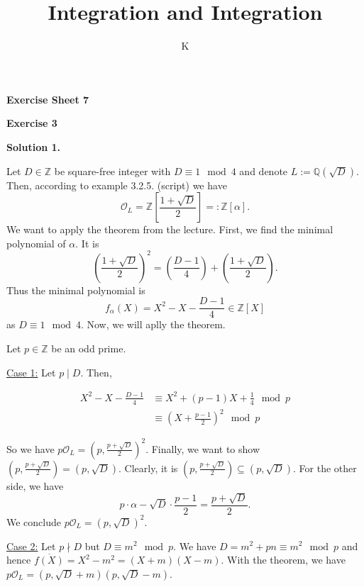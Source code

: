 \documentclass[a4paper]{article}
\title{Integration and Integration}
\author{K}
\theoremstyle{definition}
\begin{document}
\begin{center}
    \noindent\textbf{Exercise Sheet 7}
\end{center}
\noindent\textbf{Exercise 3}

\noindent\textbf{Solution 1.}

\noindent Let \(D \in \mathbb{Z}\) be square-free integer with \(D \equiv 1 \mod{4}\) and denote \(L := \mathbb{Q}(\sqrt{D})\). Then, according to example 3.2.5. (script) we have 
\begin{equation}
    \mathcal{O}_L = \mathbb{Z}\left[\frac{1 + \sqrt{D}}{2}\right] =: \mathbb{Z}[\alpha] \text{.}
\end{equation}
We want to apply the theorem from the lecture. First, we find the minimal polynomial of \(\alpha\). It is
\begin{equation}
    \left(\frac{1 + \sqrt{D}}{2}\right)^2 = \left(\frac{D - 1}{4}\right) + \left(\frac{1 + \sqrt{D}}{2}\right)\text{.}
\end{equation}
Thus the minimal polynomial is
\begin{equation}
    f_\alpha(X) = X^2 - X - \frac{D - 1}{4} \in \mathbb{Z}[X]
\end{equation}
as \(D \equiv 1 \mod{4}\). Now, we will aplly the theorem.

\bigskip

\noindent Let \(p \in \mathbb{Z}\) be an odd prime.

\noindent \underline{Case 1:} Let \(p \mid D\). Then,

\begin{align}
    X^2 - X - \frac{D - 1}{4} &\equiv X^2 + (p - 1)X + \frac{1}{4} \mod{p} \\
    &\equiv \left(X + \frac{p-1}{2}\right)^2 \mod{p}
\end{align}

\noindent So we have \(p\mathcal{O}_L = (p, \frac{p +\sqrt{D}}{2})^2\). Finally, we want to show \((p, \frac{p + \sqrt{D}}{2}) = (p, \sqrt{D})\). Clearly, it is \((p, \frac{p + \sqrt{D}}{2}) \subseteq (p, \sqrt{D})\). For the other side, we have
\begin{equation}
    p \cdot \alpha - \sqrt{D} \cdot \frac{p - 1}{2} = \frac{p + \sqrt{D}}{2} \text{.}
\end{equation}
We conclude \(p \mathcal{O}_L = (p, \sqrt{D})^2\).

\bigskip

\noindent \underline{Case 2:} Let \(p \nmid D\) but \(D \equiv m^2 \mod{p}\). We have \(D = m^2 + pn \equiv m^2 \mod{p}\) and hence \(\overline{f(X)} = X^2 - m^2 = (X + m)(X - m)\). With the theorem, we have \(p \mathcal{O}_L = (p, \sqrt{D} + m)(p, \sqrt{D} - m)\).
\end{document}
